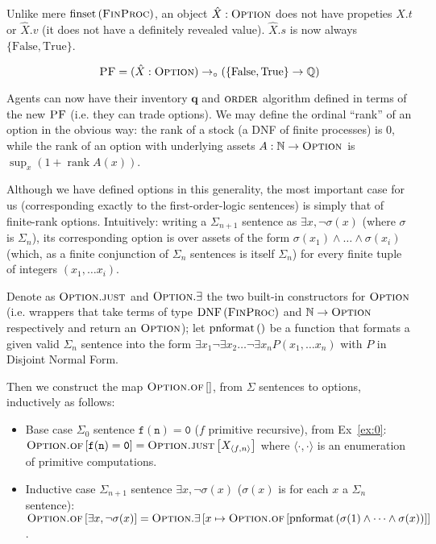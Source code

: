 \documentclass{article}
\begin{document}
Unlike mere $\finset{\FinProc}$, an object $\hat{X}:\Option$ does not have propeties $\hat{X}.t$ or $\hat{X}.v$ (it does not have a definitely revealed value). $\hat{X}.s$ is now always $\{\mathrm{False}, \mathrm{True}\}$.

\begin{equation*}
    \PF = (\hat{X}:\Option)\too \left(\{\mathrm{False}, \mathrm{True}\}\to\Rats\right)
\end{equation*}

Agents can now have their inventory $\mathbf{q}$ and $\order$ algorithm defined in terms of the new $\PF$ (i.e. they can trade options). We may define the ordinal ``rank'' of an option in the obvious way: the rank of a stock (a DNF of finite processes) is 0, while the rank of an option with underlying assets $A:\Nats\to\Option$ is $\sup_x(1+\operatorname{rank} A(x))$.

Although we have defined options in this generality, the most important case for us (corresponding exactly to the first-order-logic sentences) is simply that of finite-rank options. Intuitively: writing a $\Sigma_{n+1}$ sentence as $\exists x, \lnot \sigma(x)$ (where $\sigma$ is $\Sigma_n$), its corresponding option is over assets of the form $\sigma(x_1)\land\dots\land\sigma(x_i)$ (which, as a finite conjunction of $\Sigma_n$ sentences is itself $\Sigma_n$) for every finite tuple of integers $(x_1,\dots x_i)$. 

\begin{example}
    Denote as $\Option.\just$ and 
    $\Option.\exists$ the two built-in
    constructors for $\Option$ (i.e. wrappers that take terms of type $\DNF{\FinProc}$ and $\Nats\to\Option$ respectively and return an $\Option$); let $\operatorname{pnformat}\left(\right)$ be a function that formats a given valid $\Sigma_n$ sentence into the form $\exists x_1 \lnot \exists x_2 \dots \lnot \exists x_n P(x_1, \dots x_n)$ with $P$ in Disjoint Normal Form. 
    
    Then we construct the map $\Optionof{}$, from $\Sigma$ sentences to options, inductively as follows: 
    \begin{itemize}
        \item Base case $\Sigma_0$ sentence $\mathtt{f(n)=0}$ ($f$ primitive recursive), from Ex~\ref{ex:0}: $\Optionof{\mathtt{f(n)=0}}=\Optionjust{X_{\langle f, n\rangle}}$ where $\langle\cdot,\cdot\rangle$ is an enumeration of primitive computations.
        \item Inductive case $\Sigma_{n+1}$ sentence $\exists x, \lnot\sigma(x)$ ($\sigma(x)$ is for each $x$ a $\Sigma_n$ sentence): $\Optionof{\exists x, \lnot\sigma(x)} = \Optionsigma{x \mapsto \Optionof{\pnf{\sigma(1) \land \dots \land \sigma(x)}}}$.
    \end{itemize}
\end{example}
\end{document}

